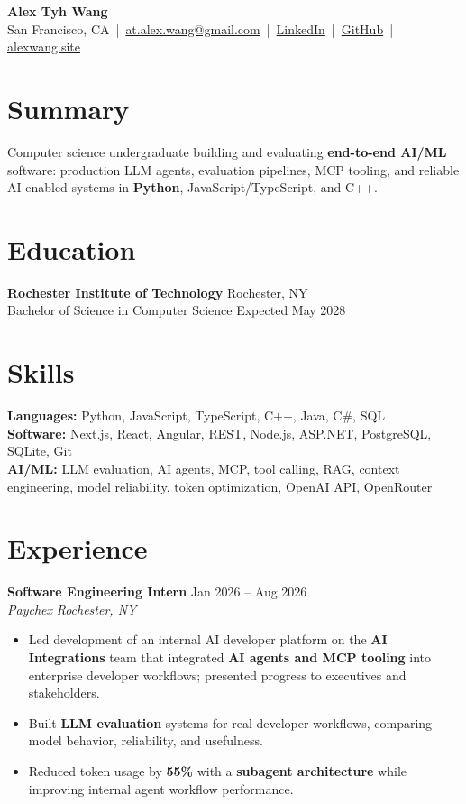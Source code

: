 \documentclass[10pt,letterpaper]{article}
\newif\ifresumeFirstRole
\newcommand{\resumeRole}[4]{%
  \ifresumeFirstRole
    \global\resumeFirstRolefalse
  \else
    \vspace{0pt plus 1fill}%
  \fi
  \textbf{#1} \hfill #2\\
  \textit{#3} \hfill \textit{#4}
}
\begin{document}
\begin{center}
{\Large \textbf{Alex Tyh Wang}}\\
San Francisco, CA \,|\, \href{mailto:at.alex.wang@gmail.com}{at.alex.wang@gmail.com} \,|\, \href{https://www.linkedin.com/in/alex-tyh-wang/}{LinkedIn} \,|\, \href{https://github.com/alextyhwang}{GitHub} \,|\, \href{https://alexwang.site}{alexwang.site}
\end{center}

\section*{Summary}
Computer science undergraduate building and evaluating \textbf{end-to-end AI/ML} software: production LLM agents, evaluation pipelines, MCP tooling, and reliable AI-enabled systems in \textbf{Python}, JavaScript/TypeScript, and C++.

\section*{Education}
\textbf{Rochester Institute of Technology} \hfill Rochester, NY\\
Bachelor of Science in Computer Science \hfill Expected May 2028

\section*{Skills}
\textbf{Languages:} Python, JavaScript, TypeScript, C++, Java, C\#, SQL\\
\textbf{Software:} Next.js, React, Angular, REST, Node.js, ASP.NET, PostgreSQL, SQLite, Git\\
\textbf{AI/ML:} LLM evaluation, AI agents, MCP, tool calling, RAG, context engineering, model reliability, token optimization, OpenAI API, OpenRouter

\section*{Experience}
\resumeRole{Software Engineering Intern}{Jan 2026 -- Aug 2026}{Paychex}{Rochester, NY}
\begin{itemize}
  \item Led development of an internal AI developer platform on the \textbf{AI Integrations} team that integrated \textbf{AI agents and MCP tooling} into enterprise developer workflows; presented progress to executives and stakeholders.
  \item Built \textbf{LLM evaluation} systems for real developer workflows, comparing model behavior, reliability, and usefulness.
  \item Reduced token usage by \textbf{55\%} with a \textbf{subagent architecture} while improving internal agent workflow performance.
\end{itemize}
\end{document}
